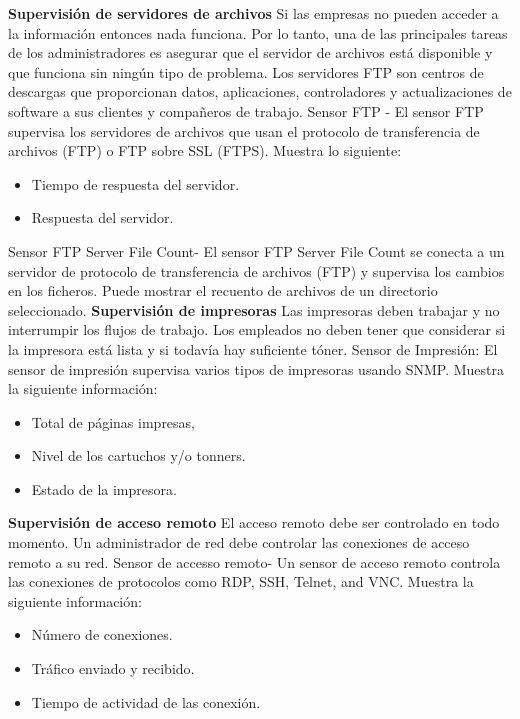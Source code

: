 \noindent
\textbf{Supervisión de servidores de archivos}
\newline
Si las empresas no pueden acceder a la información entonces nada funciona. Por lo tanto, una de las principales tareas de los administradores es asegurar que el servidor de archivos está disponible y que funciona sin ningún tipo de problema.
\newline
Los servidores FTP son centros de descargas que proporcionan datos, aplicaciones, controladores y actualizaciones de software a sus clientes y compañeros de trabajo. 
\newline
Sensor FTP - El sensor FTP supervisa los servidores de archivos que usan el protocolo de
transferencia de archivos (FTP) o FTP sobre SSL (FTPS). Muestra lo siguiente:
\begin{itemize}
	\item Tiempo de respuesta del servidor.
	\item Respuesta del servidor.
\end{itemize}
\noindent
Sensor FTP Server File Count- El sensor FTP Server File Count se conecta a un servidor de protocolo de transferencia de archivos (FTP) y supervisa los cambios en los ficheros. Puede mostrar el recuento de archivos de un directorio seleccionado.
\newline
\newline
\textbf{Supervisión de impresoras}
\newline
Las impresoras deben trabajar y no interrumpir los flujos de trabajo. Los empleados no deben tener que considerar si la impresora está lista y si todavía hay suficiente tóner.
\newline
Sensor de Impresión: El sensor de impresión supervisa varios tipos de impresoras usando SNMP. Muestra la siguiente información:
\begin{itemize}
	\item Total de páginas impresas,
	\item Nivel de los cartuchos y/o tonners.
	\item Estado de la impresora.
\end{itemize}

\noindent
\textbf{Supervisión de acceso remoto}
\newline
El acceso remoto debe ser controlado en todo momento. Un administrador de red debe controlar las conexiones de acceso remoto a su red.
\newline
Sensor de accesso remoto- Un sensor de acceso remoto controla las conexiones de protocolos como RDP, SSH, Telnet, and VNC. Muestra la siguiente información:
\begin{itemize}
	\item Número de conexiones.
	\item Tráfico enviado y recibido.
	\item Tiempo de actividad de las conexión.
\end{itemize}
